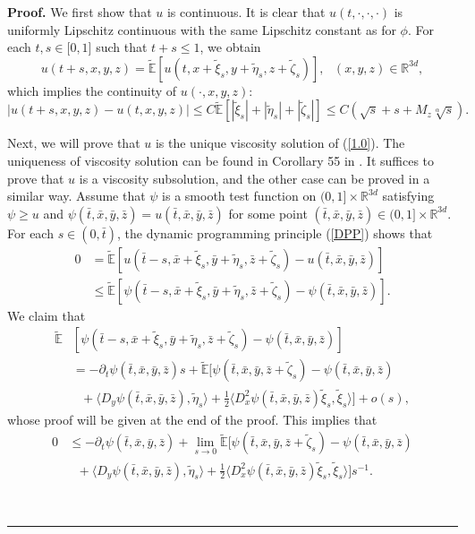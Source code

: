 \documentclass[a4paper,oneside,10pt]{article}%
\newenvironment{proof}[1][Proof]{\noindent \textbf{#1.} }{\  \rule{0.5em}{0.5em}}
\numberwithin{equation}{section}
\begin{document}
\begin{proof}
We first show that $u$ is continuous. It is clear that $u(t,\cdot,\cdot
,\cdot)$ is uniformly Lipschitz continuous with the same Lipschitz constant as
for $\phi$. For each $t,s\in \lbrack0,1]$ such that $t+s\leq1$, we obtain
\begin{equation}
u(t+s,x,y,z)=\mathbb{\tilde{E}}[u(t,x+\tilde{\xi}_{s},y+\tilde{\eta}%
_{s},z+\tilde{\zeta}_{s})],\text{ \ }(x,y,z)\in \mathbb{R}^{3d}, \label{DPP}%
\end{equation}
which implies the continuity of $u(\cdot,x,y,z)$:
\[
|u(t+s,x,y,z)-u(t,x,y,z)|\leq C\mathbb{\tilde{E}}[|\tilde{\xi}_{s}%
|+|\tilde{\eta}_{s}|+|\tilde{\zeta}_{s}|]\leq C\left(  \sqrt{s}+s+M_{z}%
\sqrt[\alpha]{s}\right)  .
\]


Next, we will prove that $u$ is the unique viscosity solution of (\ref{1.0}).
The uniqueness of viscosity solution can be found in Corollary 55 in
\cite{HP2021}. It suffices to prove that $u$ is a viscosity subsolution, and
the other case can be proved in a similar way. Assume that $\psi$ is a smooth
test function on $(0,1]\times \mathbb{R}^{3d}$ satisfying $\psi \geq u$ and
$\psi(\bar{t},\bar{x},\bar{y},\bar{z})=u(\bar{t},\bar{x},\bar{y},\bar{z})$ for
some point $(\bar{t},\bar{x},\bar{y},\bar{z})\in(0,1]\times \mathbb{R}^{3d}$.
For each $s\in(0,\bar{t})$, the dynamic programming principle (\ref{DPP})
shows that
\begin{align}
0  &  =\mathbb{\tilde{E}}[u(\bar{t}-s,\bar{x}+\tilde{\xi}_{s},\bar{y}%
+\tilde{\eta}_{s},\bar{z}+\tilde{\zeta}_{s})-u(\bar{t},\bar{x},\bar{y},\bar
{z})]\nonumber \\
&  \leq \mathbb{\tilde{E}}[\psi(\bar{t}-s,\bar{x}+\tilde{\xi}_{s},\bar
{y}+\tilde{\eta}_{s},\bar{z}+\tilde{\zeta}_{s})-\psi(\bar{t},\bar{x},\bar
{y},\bar{z})].\nonumber
\end{align}
We claim that
\begin{align}
\mathbb{\tilde{E}}  &  [\psi(\bar{t}-s,\bar{x}+\tilde{\xi}_{s},\bar{y}%
+\tilde{\eta}_{s},\bar{z}+\tilde{\zeta}_{s})-\psi(\bar{t},\bar{x},\bar{y}%
,\bar{z})]\label{1.1}\\
&  =-\partial_{t}\psi(\bar{t},\bar{x},\bar{y},\bar{z})s+\mathbb{\tilde{E}%
}[\psi(\bar{t},\bar{x},\bar{y},\bar{z}+\tilde{\zeta}_{s})-\psi(\bar{t},\bar
{x},\bar{y},\bar{z})\nonumber \\
&  \text{ \  \ }+\langle D_{y}\psi(\bar{t},\bar{x},\bar{y},\bar{z}),\tilde
{\eta}_{s}\rangle+\frac{1}{2}\langle D_{x}^{2}\psi(\bar{t},\bar{x},\bar
{y},\bar{z})\tilde{\xi}_{s},\tilde{\xi}_{s}\rangle]+o(s),\nonumber
\end{align}
whose proof will be given at the end of the proof. This implies that
\begin{align}
0  &  \leq-\partial_{t}\psi(\bar{t},\bar{x},\bar{y},\bar{z})+\lim
_{s\rightarrow0}\mathbb{\tilde{E}}[\psi(\bar{t},\bar{x},\bar{y},\bar{z}%
+\tilde{\zeta}_{s})-\psi(\bar{t},\bar{x},\bar{y},\bar{z})\label{1.6}\\
&  \text{ \  \ }+\langle D_{y}\psi(\bar{t},\bar{x},\bar{y},\bar{z}),\tilde
{\eta}_{s}\rangle+\frac{1}{2}\langle D_{x}^{2}\psi(\bar{t},\bar{x},\bar
{y},\bar{z})\tilde{\xi}_{s},\tilde{\xi}_{s}\rangle]s^{-1}.\nonumber
\end{align}



\end{proof}
\end{document}
